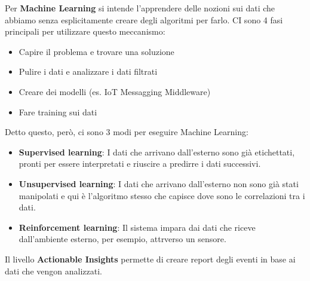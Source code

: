\documentclass[10pt,a4paper,oneside]{scrbook}
\begin{document}
Per \textbf{Machine Learning} si intende l'apprendere delle nozioni sui dati che abbiamo senza esplicitamente creare degli algoritmi per farlo. CI sono 4 fasi principali per utilizzare questo meccanismo:
\begin{itemize}
    \item Capire il problema e trovare una soluzione
    \item Pulire i dati e analizzare i dati filtrati
    \item Creare dei modelli (es. IoT Messagging Middleware)
    \item Fare training sui dati
\end{itemize}
Detto questo, però, ci sono 3 modi per eseguire Machine Learning:
\begin{itemize}
    \item \textbf{Supervised learning}: I dati che arrivano dall'esterno sono già etichettati, pronti per essere interpretati e riuscire a predirre i dati successivi.
    \item \textbf{Unsupervised learning}: I dati che arrivano dall'esterno non sono già stati manipolati e qui è l'algoritmo stesso che capisce dove sono le correlazioni tra i dati. 
    \item \textbf{Reinforcement learning}: Il sistema impara dai dati che riceve dall'ambiente esterno, per esempio, attrverso un sensore.
\end{itemize}
Il livello \textbf{Actionable Insights} permette di creare report degli eventi in base ai dati che vengon analizzati.
\end{document}
